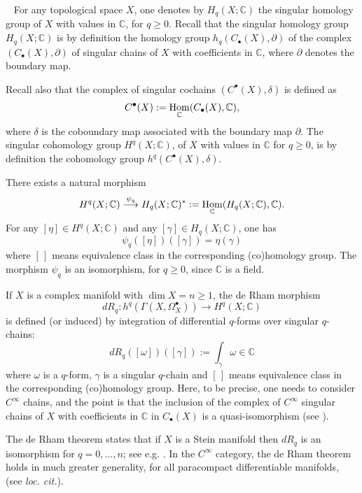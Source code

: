 \documentclass[12pt]{article}
\newcommand{\CC}{\mathbb{C}}
\DeclareMathOperator{\Hom}{\rm Hom}
\newcounter{numero}[section]
\renewcommand{\thenumero}{(\arabic{section}.\arabic{numero})}
\newenvironment{nota}{\medskip
\refstepcounter{numero}\noindent {\sc  \thenumero\ Remark.}\
}{\vspace{1ex}\par}
\begin{document}
\begin{nota}\label{comment-on-deRham-morphism}
For any topological space $X$, one denotes by $H_q(X;\CC)$ the singular homology group of $X$ with values in $\CC$, for $q \geq 0$. Recall that the singular homology group $H_q(X;\CC)$
is by definition the homology group $h_q(C_\bullet(X),\partial)$ of the complex $(C_\bullet(X),\partial)$ of singular chains of $X$ with coefficients in $\CC$, where $\partial$ denotes the boundary map.

Recall also that the complex of singular cochains $(C^\bullet(X),\delta)$ is defined as $$C^\bullet(X):=\Hom_\CC(C_\bullet(X), \CC),$$
where $\delta$ is the coboundary map associated with the boundary map $\partial$. The singular cohomology group $H^q(X;\CC)$, of $X$ with values in $\CC$ for $q\geq 0$, is by definition the cohomology group $h^q(C^\bullet(X),\delta)$.

There exists a natural morphism $$ H^q(X;\CC) \stackrel{\psi_q}{\longrightarrow} H_q(X;\CC)^*:= \Hom_\CC(H_q(X;\CC),\CC).$$ For any $[\eta]\in H^q(X;\CC)$ and any $[\gamma]\in H_q(X;\CC)$, one has $$\psi_q([\eta])([\gamma])= \eta(\gamma)$$ where $[\,]$ means equivalence class in the corresponding (co)homology group. The morphism $\psi_q$ is an isomorphism, for $q\geq 0$, since $\CC$ is a field.


If $X$ is a complex manifold with $\dim X =n\geq 1$,  the de Rham morphism $$dR_q : h^q(\Gamma(X,\Omega_X^\bullet)) \longrightarrow H^q(X;\CC)$$ is defined (or induced) by integration of differential $q$-forms over singular $q$-chains: $$dR_q([\omega])([\gamma]) := \int_\gamma \omega \in \CC$$ where $\omega$ is a $q$-form, $\gamma$ is a singular $q$-chain and $[\,]$ means equivalence class in the corresponding (co)homology group. Here, to be precise, one needs to consider $C^\infty$ chains, and the point is that the inclusion of the complex of $C^\infty$ singular chains of $X$ with coefficients in $\CC$ in $C_\bullet(X)$ is a quasi-isomorphism (see \cite[Ap. A, Th. 2.1]{massey}).

The de Rham theorem states that if $X$ is a Stein manifold then $dR_q$ is an isomorphism for $q=0,\ldots, n$; see e.g. \cite[App. A,  Th. 3.1]{massey}.
In the $C^\infty$ category, the de Rham theorem holds in much greater generality, for all paracompact differentiable manifolds, (see {\it loc. cit.}).


\end{nota}
\end{document}
